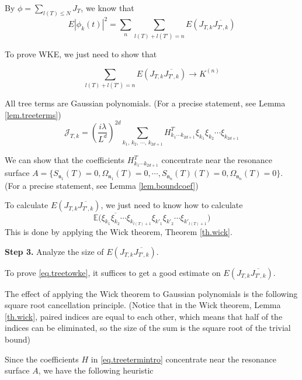 By $\phi= \sum_{l(T)\le N} J_{T}$, we know that
\begin{equation}
    E|\phi_{k}(t)|^2=\sum_{n}\sum_{l(T)+ l(T') = n}E(J_{T,k}\overline{J_{T',k}})
\end{equation}

To prove WKE, we just need to show that 

\begin{equation}\label{eq.treetowke}
    \sum_{l(T)+ l(T') = n}E(J_{T,k}\overline{J_{T',k}})\rightarrow K^{(n)}
\end{equation}

All tree terms are Gaussian polynomials. (For a precise statement, see Lemma \ref{lem.treeterms})
    \begin{equation}\label{eq.treetermintro}
        \mathcal{J}_{T,k}=\left(\frac{i\lambda}{L^{d}}\right)^{2d}\sum_{k_1,\, k_2,\, \cdots,\, k_{2d+1}} H^T_{k_1\cdots k_{2d+1}}  \xi_{k_1}\xi_{k_2}\cdots\xi_{k_{2d+1}}   
    \end{equation}

We can show that the coefficients $H^T_{k_1\cdots k_{2d+1}}$ concentrate near the resonance surface $A=\{S_{\mathfrak{n}_1}(T)=0,\Omega_{\mathfrak{n}_1}(T)=0,\cdots,S_{\mathfrak{n}_{n}}(T)(T)=0,\Omega_{\mathfrak{n}_n}(T)=0\}$. (For a precise statement, see Lemma \ref{lem.boundcoef})

To calculate $E(J_{T,k}\overline{J_{T',k}})$, we just need to know how to calculate 
\begin{equation}
    \mathbb{E}\Big(\xi_{k_1}\overline{\xi_{k_2}}\cdots\xi_{k_{l(T)+1}}\xi_{k'_1}\xi_{k'_2}\cdots\xi_{k'_{l(T)+1}}\Big)
\end{equation}
This is done by applying the Wick theorem, Theorem \ref{th.wick}.


\textbf{Step 3.} Analyze the size of $E(J_{T,k}\overline{J_{T',k}})$.

To prove \eqref{eq.treetowke}, it suffices to get a good estimate on $E(J_{T,k}\overline{J_{T',k}})$. 

The effect of applying the Wick theorem to Gaussian polynomials is the following square root cancellation principle. (Notice that in the Wick theorem, Lemma \ref{th.wick}, paired indices are equal to each other, which means that half of the indices can be eliminated, so the size of the sum is the square root of the trivial bound) 

Since the coefficients $H$ in \eqref{eq.treetermintro} concentrate near the resonance surface $A$, we have the following heuristic 

